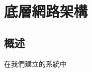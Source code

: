 \documentclass[]{report}
\begin{document}
\tableofcontents


\chapter{底層網路架構}
\section{概述}
在我們建立的系統中
\end{document}
